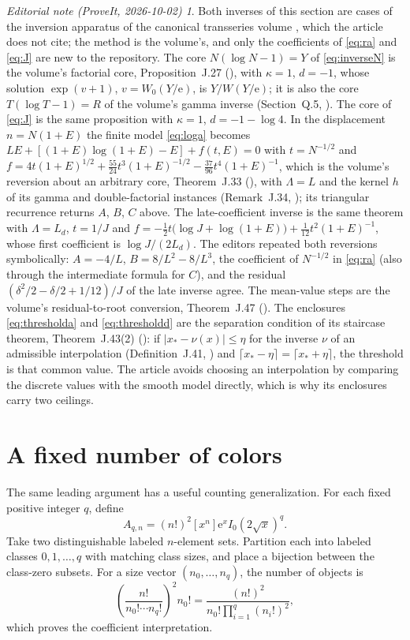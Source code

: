 \documentclass[11pt,letterpaper]{article}
\numberwithin{equation}{section}
\theoremstyle{remark}\newtheorem{remark}[theorem]{Remark}
\newtheorem*{ednote}{Editorial note (ProveIt, 2026-10-02)}
\newcommand{\e}{\mathrm e}
\begin{document}
\begin{ednote}
Both inverses of this section are cases of the inversion apparatus of the canonical transseries volume \cite{ed:tai}, which the article does not cite; the method is the volume's, and only the coefficients of \eqref{eq:ra} and \eqref{eq:J} are new to the repository.
The core $N(\log N-1)=Y$ of \eqref{eq:inverseN} is the volume's factorial core, Proposition~J.27 (), with $\kappa=1$, $d=-1$, whose solution $\exp(v+1)$, $v=W_0(Y/\e)$, is $Y/W(Y/\e)$; it is also the core $T(\log T-1)=R$ of the volume's gamma inverse (Section~Q.5, ). The core of \eqref{eq:J} is the same proposition with $\kappa=1$, $d=-1-\log4$.
In the displacement $n=N(1+E)$ the finite model \eqref{eq:loga} becomes
$LE+[(1+E)\log(1+E)-E]+f(t,E)=0$ with $t=N^{-1/2}$ and
$f=4t(1+E)^{1/2}+\frac{55}{24}t^3(1+E)^{-1/2}-\frac{37}{96}t^4(1+E)^{-1}$,
which is the volume's reversion about an arbitrary core, Theorem~J.33 (), with $\Lambda=L$ and the kernel $h$ of its gamma and double-factorial instances (Remark~J.34, ); its triangular recurrence returns $A$, $B$, $C$ above. The late-coefficient inverse is the same theorem with $\Lambda=L_d$, $t=1/J$ and $f=-\frac12t\bigl(\log J+\log(1+E)\bigr)+\frac1{12}t^2(1+E)^{-1}$, whose first coefficient is $\log J/(2L_d)$.
The editors repeated both reversions symbolically: $A=-4/L$, $B=8/L^2-8/L^3$, the coefficient of $N^{-1/2}$ in \eqref{eq:ra} (also through the intermediate formula for $C$), and the residual $(\delta^2/2-\delta/2+1/12)/J$ of the late inverse agree.
The mean-value steps are the volume's residual-to-root conversion, Theorem~J.47 (). The enclosures \eqref{eq:thresholda} and \eqref{eq:thresholdd} are the separation condition of its staircase theorem, Theorem~J.43(2) (): if $|x_\ast-\nu(x)|\le\eta$ for the inverse $\nu$ of an admissible interpolation (Definition~J.41, ) and $\lceil x_\ast-\eta\rceil=\lceil x_\ast+\eta\rceil$, the threshold is that common value. The article avoids choosing an interpolation by comparing the discrete values with the smooth model directly, which is why its enclosures carry two ceilings.
\end{ednote}

\section{A fixed number of colors}
The same leading argument has a useful counting generalization. For each fixed positive integer $q$, define
\[
 A_{q,n}=(n!)^2[x^n]\e^x I_0(2\sqrt{x})^q.
\]
Take two distinguishable labeled $n$-element sets. Partition each into labeled classes $0,1,\ldots,q$ with matching class sizes, and place a bijection between the class-zero subsets. For a size vector $(n_0,\ldots,n_q)$, the number of objects is
\[
 \left(\frac{n!}{n_0!\cdots n_q!}\right)^2n_0!
 =\frac{(n!)^2}{n_0!\prod_{i=1}^q(n_i!)^2},
\]
which proves the coefficient interpretation.
\end{document}
